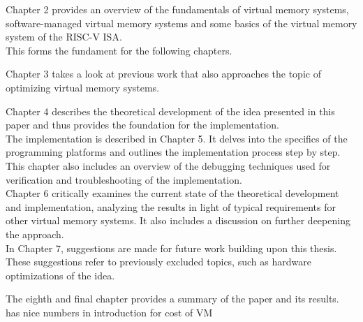 





Chapter 2 provides an overview of the fundamentals of virtual memory systems, software-managed virtual memory systems and some basics of the virtual memory system of the RISC-V ISA.\\
This forms the fundament for the following chapters.

Chapter 3 takes a look at previous work that also approaches the topic of optimizing virtual memory systems.

Chapter 4 describes the theoretical development of the idea presented in this paper and thus provides
the foundation for the implementation.\\

The implementation is described in Chapter 5. It delves into the specifics of the programming platforms
and outlines the implementation process step by step. This chapter also includes an overview of the debugging
techniques used for verification and troubleshooting of the implementation.\\

Chapter 6 critically examines the current state of the theoretical development and implementation,
analyzing the results in light of typical requirements for other virtual memory systems.
It also includes a discussion on further deepening the approach.\\
In Chapter 7, suggestions are made for future work building upon this thesis. These suggestions refer
to previously excluded topics, such as hardware optimizations of the idea.

The eighth and final chapter provides a summary of the paper and its results.\\








\cite{zagieboylo2020cost} has nice numbers in introduction for cost of VM

